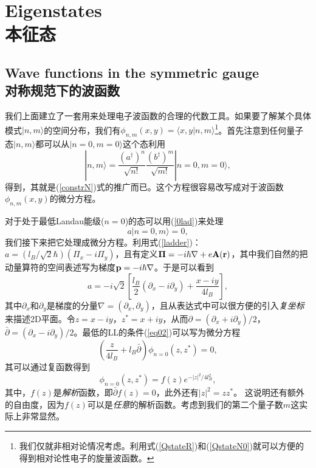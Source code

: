 \documentclass[10pt]{book}
\newcommand{\Pib}{\mbox{\boldmath $\Pi $}}
\newcommand{\bp}{{\bf p}}
\newcommand{\br}{{\bf r}}
\newcommand{\bA}{{\bf A}}
\newcommand{\beq}{\begin{equation}}
\newcommand{\eeq}{\end{equation}}
\begin{document}
\section[本征态]{Eigenstates\\\bf 本征态}




\subsection[对称规范下的波函数]{Wave functions in the symmetric gauge\\\bf 对称规范下的波函数}
\label{WFsym}

我们上面建立了一套用来处理电子波函数的合理的代数工具。如果要了解某个具体模式$|n,m\rangle$的空间分布，我们有$\phi_{n,m}(x,y)=\langle x,y|n,m\rangle$\footnote{我们仅就非相对论情况考虑。利用式(\ref{QstateR})和(\ref{QstateN0})就可以方便的得到相对论性电子的旋量波函数。}。首先注意到任何量子态$|n,m\rangle$都可以从$|n=0,m=0\rangle$这个态利用
\beq\label{constrNM}
|n,m\rangle = \frac{\left(a^{\dagger}\right)^n}{\sqrt{n!}} \frac{\left(b^{\dagger}\right)^m}{\sqrt{m!}}|n=0,m=0\rangle,
\eeq
得到，其就是(\ref{constrN})式的推广而已。这个方程很容易改写成对于波函数$\phi_{n,m}(x,y)$的微分方程。

对于处于最低Landau能级($n=0$)的态可以用(\ref{0lad})来处理
\beq\label{eq02}
a |n=0,m\rangle = 0,
\eeq
我们接下来把它处理成微分方程。利用式(\ref{ladder})：$a = (l_B/\sqrt{2}\hbar)(\Pi_x - i\Pi_y)$，且有定义$\Pib= -i\hbar\nabla + e\bA(\br)$，其中我们自然的把动量算符的空间表述写为梯度$\bp=-i\hbar\nabla$。于是可以看到 
$$a=-i\sqrt{2}\left[\frac{l_B}{2}\left(\partial_x - i\partial_y\right)+\frac{x-iy}{4l_B}\right],$$
其中$\partial_x$和$\partial_y$是梯度的分量$\nabla=(\partial_x,\partial_y)$，且从表达式中可以很方便的引入{\sl 复坐标}来描述2D平面。令$z=x-iy$，$z^*=x+iy$，从而$\partial = (\partial_x + i\partial_y)/2$，$\bar{\partial} = (\partial_x - i\partial_y)/2$。最低的LL的条件(\ref{eq02})可以写为微分方程
\beq\label{eq03}
\left(\frac{z}{4 l_B} + l_B\bar{\partial}\right) \phi_{n=0}(z,z^*) = 0,
\eeq
其可以通过复函数得到
\beq\label{eq04}
\phi_{n=0}(z,z^*) = f(z) e^{-|z|^2/4l_B^2},
\eeq
其中，$f(z)$是{\sl 解析}函数，即$\bar{\partial} f(z) = 0$，此外还有$|z|^2=zz^*$。 这说明还有额外的自由度，因为$f(z)$可以是{\it 任意}的解析函数。考虑到我们的第二个量子数$m$这实际上非常显然。
\end{document}
